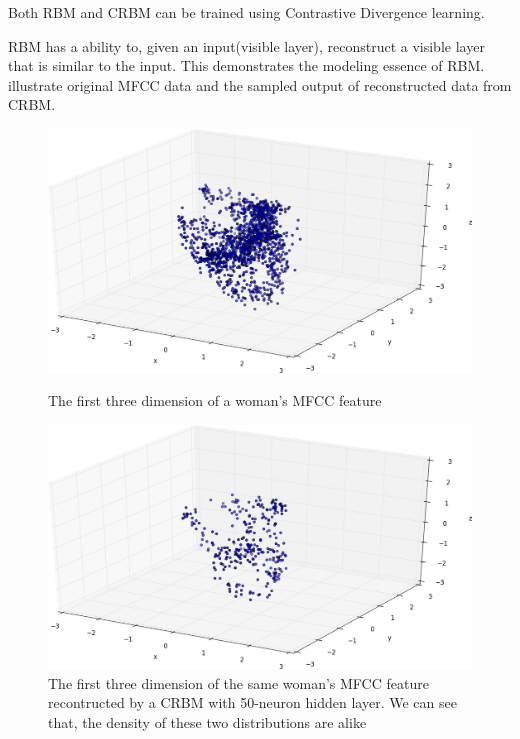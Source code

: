 \begin{enumerate}
			Both RBM and CRBM can be trained using Contrastive Divergence learning.

			RBM has a ability to, given an input(visible layer), reconstruct a visible
			layer that is similar to the input. This demonstrates the modeling essence
			of RBM.  illustrate original MFCC data and the sampled output of
			reconstructed data from CRBM.
			\begin{figure}[!ht]
				\label{fig:crbm}
				\begin{minipage}{0.48\linewidth}
					\centering
					\includegraphics[width=\linewidth]{res/all.trimed.png}
					\caption{The first three dimension of a woman's MFCC feature}
				\end{minipage}
				\hfill
				\begin{minipage}{0.48\linewidth}
					\centering
					\includegraphics[width=\linewidth]{res/50.trimed.png}
					\caption{The first three dimension of the same woman's MFCC feature
					recontructed by a CRBM with 50-neuron hidden layer. We can
					see that, the density of these two distributions are alike}
				\end{minipage}
			\end{figure}


\end{enumerate}
